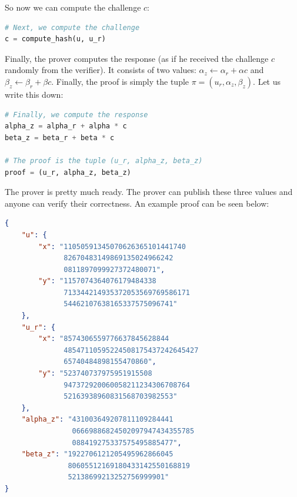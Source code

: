 \documentclass[../lecture-notes-148x210.tex]{subfiles}
\begin{document}
So now we can compute the challenge $c$:
\begin{lstlisting}[language=Python]
# Next, we compute the challenge
c = compute_hash(u, u_r)
\end{lstlisting}

Finally, the prover computes the response (as if he received the challenge $c$
randomly from the verifier). It consists of two values: $\alpha_z \gets \alpha_r
+ \alpha c$ and $\beta_z \gets \beta_r + \beta c$. Finally, the proof is simply
the tuple $\pi=(u_r,\alpha_z,\beta_z)$. Let us write this down:
\begin{lstlisting}[language=Python]
# Finally, we compute the response
alpha_z = alpha_r + alpha * c
beta_z = beta_r + beta * c

# The proof is the tuple (u_r, alpha_z, beta_z)
proof = (u_r, alpha_z, beta_z)
\end{lstlisting}

The prover is pretty much ready. The prover can publish these three values and anyone 
can verify their correctness. An example proof can be seen below:
\begin{center}
    \begin{tcolorbox}[enhanced,
        width=0.925\textwidth,
        title=\textbf{proof.json},
        coltitle=gray!25!black,
        attach boxed title to top center={yshift=-2mm,yshifttext=-1mm},
        boxed title style={size=small,colframe=gray!75!black,
        colback=purple!30!white,boxrule=1pt},
        top=-0.35cm,
        bottom=-0.35cm]
        \begin{lstlisting}[language=JSON,numbers=none,basicstyle=\ttfamily\scriptsize]
{
    "u": {
        "x": "11050591345070626365101441740
              82670483149869135024966242
              0811897099927372480071",
        "y": "1157074364076179484338
              713344214935372053569769586171
              54462107638165337575096741"
    },
    "u_r": {
        "x": "8574306559776637845628844
              48547110595224508175437242645427
              65740484898155470860",
        "y": "523740737975951915508
              947372920060058211234306708764
              52163938960831568703982553"
    },
    "alpha_z": "431003649207811109284441
                06669886824502097947434355785
                088419275337575495885477",
    "beta_z": "1922706121205495962866045
               80605512169180433142550168819
               52138699213252756999901"
}
        \end{lstlisting}
    \end{tcolorbox}
\end{center}
\end{document}
